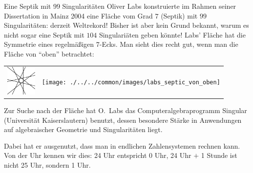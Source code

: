 \begin{surferPage}{Eine Septik mit 99 Singularitäten}
   Oliver Labs konstruierte im Rahmen seiner Dissertation in Mainz 2004 eine
    Fläche vom Grad $7$ (Septik) mit $99$ Singularitäten: derzeit Weltrekord! 
    Bisher ist aber kein Grund bekannt, warum es nicht sogar eine Septik mit
    $104$ Singulariäten geben könnte!  
    Labs' Fläche hat die Symmetrie eines regelmäßigen $7$-Ecks.
    Man sieht dies recht gut, wenn man die Fläche von ``oben'' betrachtet:
    \vspace*{-0.3em}
    \begin{center}
      \begin{tabular}{c@{\qquad}c}
        \includegraphics[height=1.5cm]{./../../common/images/labsseptic1.pdf}
        &
        \texttt{[image: ./../../common/images/labs\_septic\_von\_oben]}
      \end{tabular}
    \end{center}
    \vspace*{-0.3em}
    Zur Suche nach der Fläche hat O.\ Labs das Computeralgebraprogramm
    {\sc Singular} (Universit\"at Kaiserslautern) benutzt, dessen besondere Stärke in
    Anwendungen auf 
    algebraischer Geometrie und Singularitäten liegt.

    Dabei hat er ausgenutzt, dass man in endlichen
    Zahlensystemen rechnen kann. Von der Uhr kennen wir dies: 24 Uhr
    entspricht 0 Uhr, 24 Uhr $+$ 1 Stunde ist nicht 25 Uhr, sondern 1
    Uhr.
\end{surferPage}
